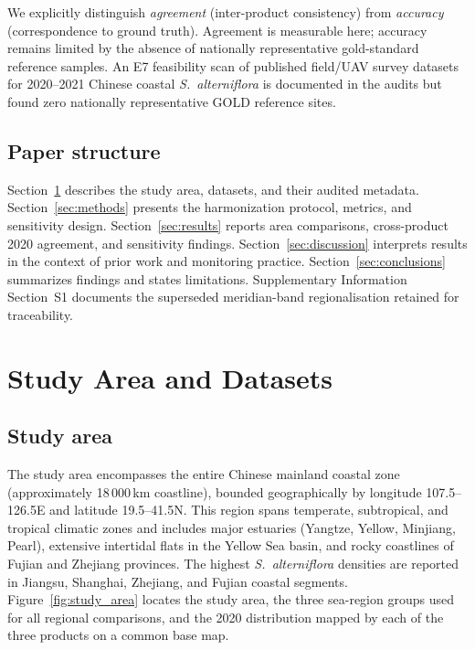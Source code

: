 \documentclass[11pt]{article}
\begin{document}
We explicitly distinguish \textit{agreement} (inter-product consistency) from
\textit{accuracy} (correspondence to ground truth). Agreement is measurable here;
accuracy remains limited by the absence of nationally representative gold-standard
reference samples. An E7 feasibility scan of published field/UAV survey datasets
for 2020--2021 Chinese coastal \textit{S.~alterniflora} is documented in the
audits but found zero nationally representative GOLD reference sites.

\subsection{Paper structure}

Section~\ref{sec:study-area} describes the study area, datasets, and their
audited metadata. Section~\ref{sec:methods} presents the harmonization protocol,
metrics, and sensitivity design. Section~\ref{sec:results} reports area
comparisons, cross-product 2020 agreement, and sensitivity findings.
Section~\ref{sec:discussion} interprets results in the context of prior work
and monitoring practice. Section~\ref{sec:conclusions} summarizes findings and
states limitations. Supplementary Information Section~S1 documents the
superseded meridian-band regionalisation retained for traceability.

\section{Study Area and Datasets}
\label{sec:study-area}

\subsection{Study area}

The study area encompasses the entire Chinese mainland coastal zone
(approximately 18\,000\,km coastline), bounded geographically by longitude
107.5\textdegree{}--126.5\textdegree{}E and latitude 19.5\textdegree{}--41.5\textdegree{}N.
This region spans temperate, subtropical, and tropical climatic zones and
includes major estuaries (Yangtze, Yellow, Minjiang, Pearl), extensive
intertidal flats in the Yellow Sea basin, and rocky coastlines of Fujian and
Zhejiang provinces. The highest \textit{S.~alterniflora} densities are reported
in Jiangsu, Shanghai, Zhejiang, and Fujian coastal segments.
Figure~\ref{fig:study_area} locates the study area, the three sea-region
groups used for all regional comparisons, and the 2020 distribution mapped
by each of the three products on a common base map.
\end{document}
